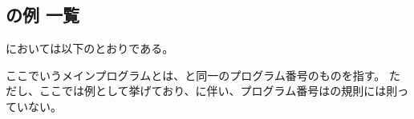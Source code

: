 






\subsection{\CreatedNCMainPrg の例 一覧}
\DMC において\CreatedNCMainPrg は以下のとおりである。
\begin{marker}
ここでいうメインプログラムとは、\DrawingNumber と同一のプログラム番号のものを指す。
ただし、ここでは例として挙げており、に伴い、プログラム番号はの規則には則っていない。
\end{marker}


